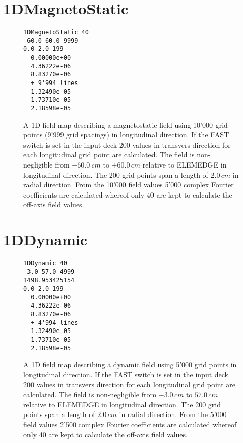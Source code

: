 \section{1DMagnetoStatic}
\label{sec:1DMagnetoStatic}
\begin{figure}[h]
\label{fig:1DMagnetoStatic}
\begin{fmpage}
\begin{verbatim}
1DMagnetoStatic 40
-60.0 60.0 9999
0.0 2.0 199
  0.00000e+00  
  4.36222e-06  
  8.83270e-06  
  + 9'994 lines
  1.32490e-05  
  1.73710e-05  
  2.18598e-05  
\end{verbatim}
\end{fmpage}
\caption[Example of a 1DMagnetoStatic field map]{A 1D field map describing a magnetostatic field using 10'000 grid points (9'999 grid spacings) in longitudinal direction. If the FAST switch is set in the input deck 200 values in transvers direction for each longitudinal grid point are calculated. The field is non-negligible from $-60.0\,cm$ to $+60.0\,cm$ relative to ELEMEDGE in longitudinal direction. The 200 grid points span a length of $2.0\,cm$ in radial direction. From the 10'000 field values 5'000 complex Fourier coefficients are calculated whereof only 40 are kept to calculate the off-axis field values.}
\end{figure}
\clearpage
\section{1DDynamic}
\label{sec:1DDynamic}
\begin{figure}[h]
\label{fig:1DDynamic}
\begin{fmpage}
\begin{verbatim}
1DDynamic 40
-3.0 57.0 4999
1498.953425154
0.0 2.0 199
  0.00000e+00
  4.36222e-06
  8.83270e-06
  + 4'994 lines
  1.32490e-05
  1.73710e-05
  2.18598e-05
\end{verbatim}
\end{fmpage}
\caption[Example of a 1DDynamic field map]{A 1D field map describing a dynamic field using 5'000 grid points in longitudinal direction. If the FAST switch is set in the input deck 200 values in transvers direction for each longitudinal grid point are calculated. The field is non-negligible from $-3.0\,cm$ to $57.0\,cm$ relative to ELEMEDGE in longitudinal direction. The 200 grid points span a length of $2.0\,cm$ in radial direction. From the 5'000 field values 2'500 complex Fourier coefficients are calculated whereof only 40 are kept to calculate the off-axis field values.}
\end{figure}
\clearpage

